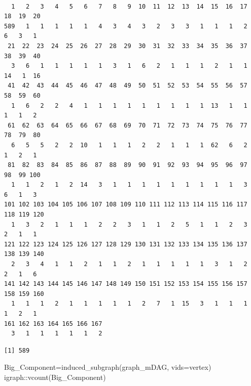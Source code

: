 \documentclass[
  letterpaper,
  DIV=11,
  numbers=noendperiod]{scrreprt}
\newenvironment{Shaded}{}{}
\newcommand{\AttributeTok}[1]{\textcolor[rgb]{0.78,0.47,0.87}{#1}}
\newcommand{\FunctionTok}[1]{\textcolor[rgb]{0.38,0.69,0.94}{#1}}
\newcommand{\NormalTok}[1]{\textcolor[rgb]{0.67,0.70,0.75}{#1}}
\newcommand{\OtherTok}[1]{\textcolor[rgb]{0.15,0.68,0.38}{#1}}
\newcommand{\SpecialCharTok}[1]{\textcolor[rgb]{0.34,0.71,0.76}{#1}}
\begin{document}
\begin{Shaded}
\end{Shaded}

\begin{verbatim}

  1   2   3   4   5   6   7   8   9  10  11  12  13  14  15  16  17  18  19  20 
589   1   1   1   1   1   4   3   4   3   2   3   3   1   1   1   2   6   3   1 
 21  22  23  24  25  26  27  28  29  30  31  32  33  34  35  36  37  38  39  40 
  3   6   1   1   1   1   1   3   1   6   2   1   1   1   2   1   1  14   1  16 
 41  42  43  44  45  46  47  48  49  50  51  52  53  54  55  56  57  58  59  60 
  1   6   2   2   4   1   1   1   1   1   1   1   1   1  13   1   1   1   1   2 
 61  62  63  64  65  66  67  68  69  70  71  72  73  74  75  76  77  78  79  80 
  6   5   5   2   2  10   1   1   1   2   2   1   1   1  62   6   2   1   2   1 
 81  82  83  84  85  86  87  88  89  90  91  92  93  94  95  96  97  98  99 100 
  1   1   2   1   2  14   3   1   1   1   1   1   1   1   1   1   3   6   1   3 
101 102 103 104 105 106 107 108 109 110 111 112 113 114 115 116 117 118 119 120 
  1   3   2   1   1   1   2   2   3   1   1   2   5   1   1   2   3   2   1   1 
121 122 123 124 125 126 127 128 129 130 131 132 133 134 135 136 137 138 139 140 
  2   3   4   1   1   2   1   1   2   1   1   1   1   1   3   1   2   2   1   6 
141 142 143 144 145 146 147 148 149 150 151 152 153 154 155 156 157 158 159 160 
  1   1   1   2   1   1   1   1   1   2   7   1  15   3   1   1   1   1   2   1 
161 162 163 164 165 166 167 
  3   1   1   1   1   1   2 
\end{verbatim}

\begin{Shaded}
\end{Shaded}

\begin{verbatim}
[1] 589
\end{verbatim}

\begin{Shaded}
\begin{Highlighting}[]
\NormalTok{Big\_Component}\OtherTok{=}\FunctionTok{induced\_subgraph}\NormalTok{(graph\_mDAG, }\AttributeTok{vids=}\NormalTok{vertex)}
\NormalTok{igraph}\SpecialCharTok{::}\FunctionTok{vcount}\NormalTok{(Big\_Component)}
\end{Highlighting}
\end{Shaded}
\end{document}
